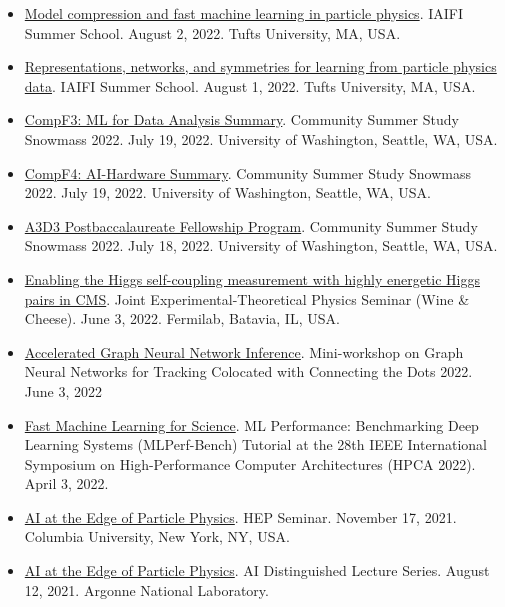 \documentclass[11pt]{res}
\begin{document}
\begin{resume}
  \begin{itemize}
    \itemsep-0.3em
    \item \href{https://iaifi.org/summer-school-agenda}{Model compression and fast machine learning in particle physics}. IAIFI Summer School. August 2, 2022. Tufts University, MA, USA.
    \item \href{https://iaifi.org/summer-school-agenda}{Representations, networks, and symmetries for learning from particle physics data}. IAIFI Summer School. August 1, 2022. Tufts University, MA, USA.
    \item \href{https://indico.fnal.gov/event/22303/contributions/245447}{CompF3: ML for Data Analysis Summary}. Community Summer Study Snowmass 2022. July 19, 2022. University of Washington, Seattle, WA, USA.
    \item \href{https://indico.fnal.gov/event/22303/contributions/245914}{CompF4: AI-Hardware Summary}. Community Summer Study Snowmass 2022. July 19, 2022. University of Washington, Seattle, WA, USA.
    \item \href{https://indico.fnal.gov/event/22303/contributions/244766}{A3D3 Postbaccalaureate Fellowship Program}. Community Summer Study Snowmass 2022. July 18, 2022. University of Washington, Seattle, WA, USA.
    \item \href{https://indico.fnal.gov/event/55499/}{Enabling the Higgs self-coupling measurement with highly energetic Higgs pairs in CMS}. Joint Experimental-Theoretical Physics Seminar (Wine \& Cheese). June 3, 2022. Fermilab, Batavia, IL, USA.
    \item \href{https://indico.cern.ch/event/1128328/contributions/4900731/}{Accelerated Graph Neural Network Inference}. Mini-workshop on Graph Neural Networks for Tracking Colocated with Connecting the Dots 2022. June 3, 2022
    \item \href{https://sites.google.com/g.harvard.edu/mlperf-bench-hpca22/home}{Fast Machine Learning for Science}. ML Performance: Benchmarking Deep Learning Systems (MLPerf-Bench) Tutorial at the 28th IEEE International Symposium on High-Performance Computer Architectures (HPCA 2022). April 3, 2022.
    \item \href{https://physics.columbia.edu/events/hep-seminar-dr-javier-duarte-ucsd}{AI at the Edge of Particle Physics}. HEP Seminar. November 17, 2021. Columbia University, New York, NY, USA.
    \item \href{https://www.anl.gov/event/ai-at-the-edge-of-particle-physics}{AI at the Edge of Particle Physics}. AI Distinguished Lecture Series. August 12, 2021. Argonne National Laboratory.

\end{itemize}
\end{resume}
\end{document}
